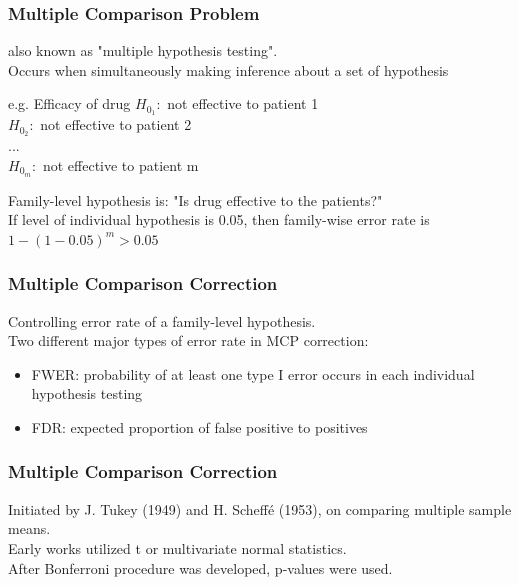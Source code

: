 \documentclass{beamer}
\begin{document}
\frame
{
  \frametitle{\LARGE{Multiple Comparison Problem}}
    also known as "multiple hypothesis testing".\\
    Occurs when simultaneously making inference about a set of hypothesis
    \vspace{0.2in}\\
    
    \begin{block}{e.g. Efficacy of drug}
    \center $H_{0_1}:$ not effective to patient 1\\
    $H_{0_2}:$ not effective to patient 2\\
    ...\\
    $H_{0_m}:$ not effective to patient m\vspace{0.15in}\\
    \end{block}
    
    Family-level hypothesis is: "Is drug effective to the patients?"\\
    If level of individual hypothesis is 0.05, then family-wise error rate is $1-(1-0.05)^m > 0.05$
}

\frame
{
  \frametitle{Multiple Comparison Correction}
    Controlling error rate of a family-level hypothesis.\vspace{0.2in}\\
    Two different major types of error rate in MCP correction:
    \begin{itemize}
      \item FWER: probability of at least one type I error occurs in each individual hypothesis testing
      \item FDR: expected proportion of false positive to positives\vspace{0.2in}\\
    \end{itemize}
}

\frame
{
  \frametitle{Multiple Comparison Correction}
    Initiated by J. Tukey (1949) and H. Scheff\'e (1953), on comparing multiple sample means.\vspace{0.2in}\\
    
    Early works utilized t or multivariate normal statistics.\vspace{0.1in}\\
    After Bonferroni procedure was developed, p-values were used.
}
\end{document}
